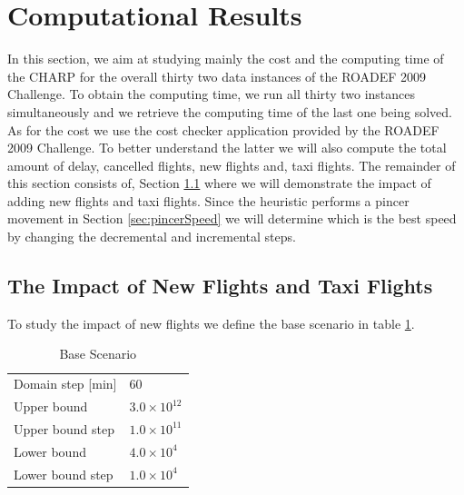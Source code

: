 \section{Computational Results}\label{sec:compResults}

In this section, we aim at studying mainly the cost and the computing time of the CHARP for the overall thirty two data instances of the ROADEF 2009 Challenge. To obtain the computing time, we run all thirty two instances simultaneously and we retrieve the computing time of the last one being solved. As for the cost we use the cost checker application provided by the ROADEF 2009 Challenge. To better understand the latter we will also compute the total amount of delay, cancelled flights, new flights and, taxi flights. The remainder of this section consists of, Section \ref{sec:impact} where we will demonstrate the impact of adding new flights and taxi flights. Since the heuristic performs a pincer movement in Section \ref{sec:pincerSpeed} we will determine which is the best speed by changing the decremental and incremental steps.\\
 
\subsection{The Impact of New Flights and Taxi Flights}\label{sec:impact}
To study the impact of new flights we define the base scenario in table \ref{tbl:baseScenario}. 

	\begin{table}[h!]
		\centering
		\caption{Base Scenario}
		\label{tbl:baseScenario}
		\begin{tabular}{ll}
			\hline
			Domain step {[}min{]} & 60                           \\
			Upper bound           & $3.0 \times 10^{12}$ \\
			Upper bound step      & $1.0 \times 10^{11}$ \\
			Lower bound           & $4.0 \times 10^4$ \\
			Lower bound step      & $1.0 \times 10^4$ \\
			\hline
		\end{tabular}
	\end{table}

